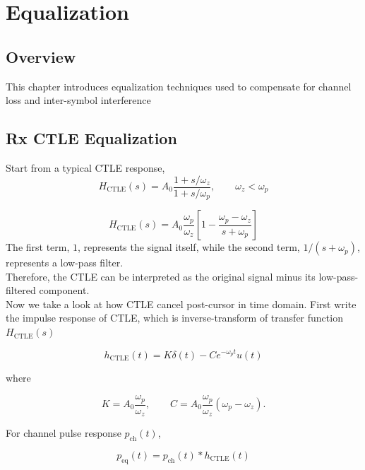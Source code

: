 \chapter{Equalization}

\section{Overview}

This chapter introduces equalization techniques used to
compensate for channel loss and inter-symbol interference

\section{Rx CTLE Equalization}
Start from a typical CTLE response,
\begin{equation}
H_{\mathrm{CTLE}}(s)
=
A_0\frac{1+s/\omega_z}{1+s/\omega_p},
\qquad
\omega_z<\omega_p
\end{equation}

\begin{equation}
H_{\mathrm{CTLE}}(s)
=
A_0\frac{\omega_p}{\omega_z}
\left[
1-\frac{\omega_p-\omega_z}{s+\omega_p}
\right]
\end{equation}
The first term, \(1\), represents the signal itself, while the second term, \(1/(s+\omega_p)\), represents a low-pass filter. \\
Therefore, the CTLE can be interpreted as the original signal minus its low-pass-filtered component.\\
Now we take a look at how CTLE cancel post-cursor in time domain. First write the impulse response of CTLE, which is inverse-transform of transfer function \(H_{\mathrm{CTLE}}(s)\)

\begin{equation}
h_{\mathrm{CTLE}}(t)
=
K\delta(t)-Ce^{-\omega_p t}u(t)
\end{equation}

where

\begin{equation}
K=A_0\frac{\omega_p}{\omega_z},
\qquad
C=A_0\frac{\omega_p}{\omega_z}(\omega_p-\omega_z).
\end{equation}

For channel pulse response \(p_{\mathrm{ch}}(t)\),

\begin{equation}
p_{\mathrm{eq}}(t)
=
p_{\mathrm{ch}}(t)*h_{\mathrm{CTLE}}(t)
\end{equation}

